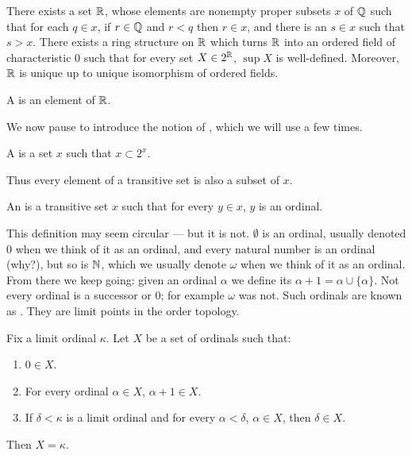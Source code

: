 \begin{theorem}[Dedekind]
There exists a set $\mathbb{R}$, whose elements are nonempty proper subsets $x$ of $\mathbb{Q}$ such that for each $q \in x$, if $r \in \mathbb{Q}$ and $r < q$ then $r \in x$, and there is an $s \in x$ such that $s > x$.
There exists a ring structure on $\mathbb{R}$ which turns $\mathbb{R}$ into an ordered field of characteristic $0$ such that for every set $X \in 2^{\mathbb{R}}$, $\sup X$ is well-defined.
Moreover, $\mathbb{R}$ is unique up to unique isomorphism of ordered fields.
\end{theorem}

\begin{definition}
A  is an element of $\mathbb{R}$.
\end{definition}

\begin{subsec}
We now pause to introduce the notion of , which we will use a few times.
\end{subsec}

\begin{definition}
A  is a set $x$ such that $x \subset 2^{x}$.
\end{definition}

\begin{subsec}
Thus every element of a transitive set is also a subset of $x$.
\end{subsec}

\begin{definition}\label{ordinal dfn}
An  is a transitive set $x$ such that for every $y \in x$, $y$ is an ordinal.
\end{definition}

\begin{subsec}
This definition may seem circular --- but it is not. $\emptyset$ is an ordinal, usually denoted $0$ when we think of it as an ordinal, and every natural number is an ordinal (why?), but so is $\mathbb{N}$, which we usually denote $\omega$ when we think of it as an ordinal.
From there we keep going: given an ordinal $\alpha$ we define its  $\alpha + 1 = \alpha \cup \{\alpha\}$.
Not every ordinal is a successor or $0$; for example $\omega$ was not. Such ordinals are known as .
They are limit points in the order topology.
\end{subsec}

\begin{theorem}\label{transfinite induction}
Fix a limit ordinal $\kappa$. Let $X$ be a set of ordinals such that:
\begin{enumerate}
\item $0 \in X$.
\item For every ordinal $\alpha \in X$, $\alpha + 1 \in X$.
\item If $\delta < \kappa$ is a limit ordinal and for every $\alpha < \delta$, $\alpha \in X$, then $\delta \in X$.
\end{enumerate}
Then $X = \kappa$.
\end{theorem}

